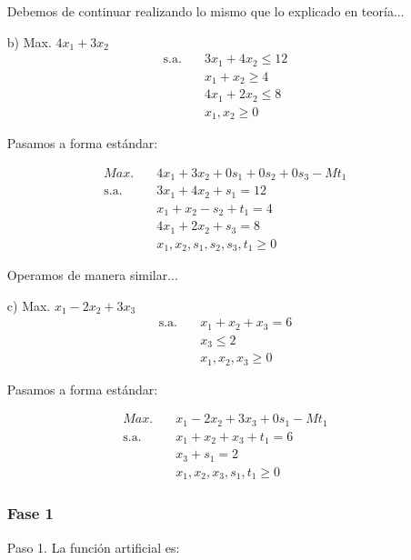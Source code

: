 \begin{itemize}
    Debemos de continuar realizando lo mismo que lo explicado en teoría...
    

    
    \item[b)] Max. $4x_1 + 3x_2$
    \begin{align*}
        \text{s.a.} \quad & 3x_1 + 4x_2 \leq 12 \\
        & x_1 + x_2 \geq 4 \\
        & 4x_1 + 2x_2 \leq 8 \\
        & x_1, x_2 \geq 0
    \end{align*}

    Pasamos a forma estándar:

    \begin{align*}
        Max. \quad & 4x_1 + 3x_2 + 0s_1 + 0s_2 + 0s_3 - Mt_1\\
        \text{s.a.} \quad & 3x_1 + 4x_2 + s_1 = 12 \\
        & x_1 + x_2 - s_2 + t_1 = 4 \\
        & 4x_1 + 2x_2 + s_3 = 8 \\
        & x_1, x_2, s_1, s_2, s_3, t_1 \geq 0 
    \end{align*}

    Operamos de manera similar...
    
    \item[c)] Max. $x_1 - 2x_2 + 3x_3$
    \begin{align*}
        \text{s.a.} \quad & x_1 + x_2 + x_3 = 6 \\
        & x_3 \leq 2 \\
        & x_1, x_2, x_3 \geq 0
    \end{align*}

    Pasamos a forma estándar:

    \begin{align*}
        Max. \quad & x_1 - 2x_2 + 3x_3 + 0s_1 -Mt_1\\
        \text{s.a.} \quad & x_1 + x_2 + x_3 + t_1= 6 \\
        & x_3 + s_1 = 2 \\
        & x_1, x_2, x_3, s_1, t_1 \geq 0
    \end{align*}

    \subsubsection*{Fase 1}

    Paso 1. La función artificial es: 


\end{itemize}
